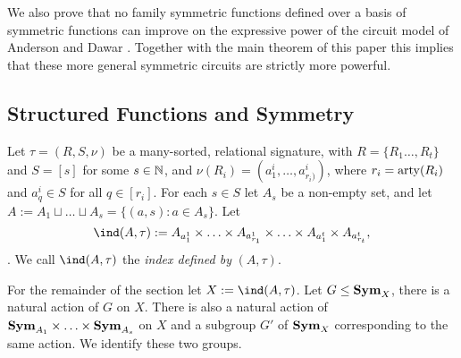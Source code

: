 \documentclass[../paper.tex]{subfiles}
\begin{document}
We also prove that no family symmetric functions defined over a basis of
symmetric functions can improve on the expressive power of the circuit model of
Anderson and Dawar \cite{AndersonD17}. Together with the main theorem of this
paper this implies that these more general symmetric circuits are strictly more
powerful.





\subsection{Structured Functions and Symmetry}
Let $\tau = (R, S, \nu)$ be a many-sorted, relational signature, with $R = \{R_1
\ldots, R_t\}$ and $S = [s]$ for some $s \in \mathbb{N}$, and $\nu(R_i) = (a^i_1,
\ldots , a^i_{r_i)})$, where $r_i = \mathrm{arty}(R_i)$ and $a^i_q \in S$ for all $q \in
[r_i]$. For each $s \in S$ let $A_s$ be a non-empty set, and let $A := A_{1}
\sqcup \ldots \sqcup A_{s} = \{(a,s) : a \in A_s\}$. Let
\[
  \ind (A, \tau) := A_{a^1_1} \times \ldots \times A_{a^1_{r_1}} \times \ldots
  \times A_{a^t_1} \times A_{a^t_{r_t}},
\]. We call $\ind (A, \tau)$ the \emph{index defined by} $(A, \tau)$.


For the remainder of the section let $X := \ind (A, \tau)$. Let $G \leq
\text{\textbf{Sym}}_{X}$, there is a natural action of $G$ on $X$. There is also a natural
action of $\text{\textbf{Sym}}_{A_1} \times \ldots \times \text{\textbf{Sym}}_{A_s}$ on $X$ and a subgroup
$G'$ of $\text{\textbf{Sym}}_X$ corresponding to the same action. We identify these two groups.
\end{document}
